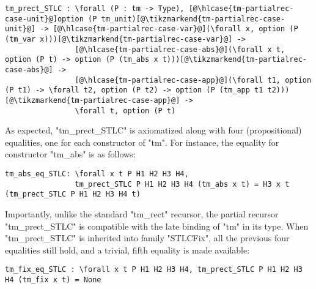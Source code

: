 \begin{centered}
\begin{minipage}{.97\textwidth}
\newcommand\hlcase[1]{\tikzmarkin[disable rounded corners=true,set fill color=yellow!18,set border color=yellow!18]{#1}(0.00,-0.05)(-0.00,0.20)}
\begin{lstlisting}[basicstyle=\fontsize{8.25}{9}\ttfamily]
tm_prect_STLC : \forall (P : tm -> Type), [@\hlcase{tm-partialrec-case-unit}@]option (P tm_unit)[@\tikzmarkend{tm-partialrec-case-unit}@] -> [@\hlcase{tm-partialrec-case-var}@](\forall x, option (P (tm_var x)))[@\tikzmarkend{tm-partialrec-case-var}@] ->
                [@\hlcase{tm-partialrec-case-abs}@](\forall x t, option (P t) -> option (P (tm_abs x t)))[@\tikzmarkend{tm-partialrec-case-abs}@] ->
                [@\hlcase{tm-partialrec-case-app}@](\forall t1, option (P t1) -> \forall t2, option (P t2) -> option (P (tm_app t1 t2)))[@\tikzmarkend{tm-partialrec-case-app}@] ->
                \forall t, option (P t)
\end{lstlisting}
\end{minipage}
\end{centered}

\noindent
As expected, "tm_prect_STLC" is axiomatized along with
four (propositional) equalities, one for each constructor of "tm".
For instance, the equality for constructor "tm_abs" is as follows:

\begin{centered}
\begin{minipage}{\textwidth}
\begin{lstlisting}[basicstyle=\fontsize{8.25}{9}\ttfamily]
tm_abs_eq_STLC: \forall x t P H1 H2 H3 H4,
                tm_prect_STLC P H1 H2 H3 H4 (tm_abs x t) = H3 x t (tm_prect_STLC P H1 H2 H3 H4 t)
\end{lstlisting}
\end{minipage}
\end{centered}

Importantly, unlike the standard "tm_rect" recursor, the partial recursor
"tm_prect_STLC" is compatible with the late binding of "tm" in its type.
When "tm_prect_STLC" is inherited into family "STLCFix", all the previous four equalities
still hold, and a trivial, fifth equality is made available:

\begin{centered}
\begin{minipage}{.88\textwidth}
\begin{lstlisting}[basicstyle=\fontsize{8.25}{9}\ttfamily]
tm_fix_eq_STLC : \forall x t P H1 H2 H3 H4, tm_prect_STLC P H1 H2 H3 H4 (tm_fix x t) = None
\end{lstlisting}
\end{minipage}
\end{centered}

